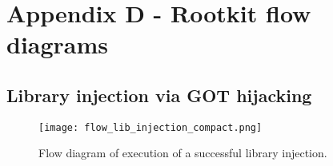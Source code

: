 \chapter* {Appendix D - Rootkit flow diagrams} \label{annex:flow_diagrams}
\section*{Library injection via GOT hijacking} \label{annexsec:lib_injection}
\begin{figure}[htbp]
	\centering
	\texttt{[image: flow\_lib\_injection\_compact.png]}
	\caption{Flow diagram of execution of a successful library injection.}
	\label{fig:flow_lib_injection_compact}
\end{figure}